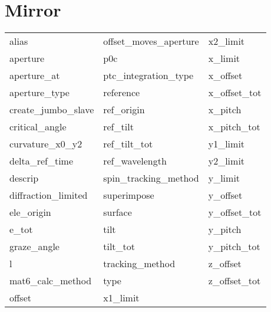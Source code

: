  \section{Mirror}
 \label{s:list.mirror}
 
 \begin{tabular}{lll} \toprule
alias                       & offset_moves_aperture       & x2_limit                    \\
aperture                    & p0c                         & x_limit                     \\
aperture_at                 & ptc_integration_type        & x_offset                    \\
aperture_type               & reference                   & x_offset_tot                \\
create_jumbo_slave          & ref_origin                  & x_pitch                     \\
critical_angle              & ref_tilt                    & x_pitch_tot                 \\
curvature_x0_y2             & ref_tilt_tot                & y1_limit                    \\
delta_ref_time              & ref_wavelength              & y2_limit                    \\
descrip                     & spin_tracking_method        & y_limit                     \\
diffraction_limited         & superimpose                 & y_offset                    \\
ele_origin                  & surface                     & y_offset_tot                \\
e_tot                       & tilt                        & y_pitch                     \\
graze_angle                 & tilt_tot                    & y_pitch_tot                 \\
l                           & tracking_method             & z_offset                    \\
mat6_calc_method            & type                        & z_offset_tot                \\
offset                      & x1_limit                    &                             \\
 \bottomrule
 \end{tabular}
 \vfill
 
